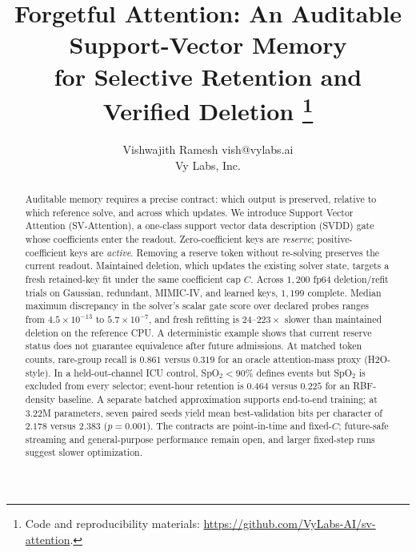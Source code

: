 \documentclass{article}
\title{Forgetful Attention: An Auditable Support-Vector Memory\\
for Selective Retention and Verified Deletion%
\thanks{Code and reproducibility materials:
\url{https://github.com/VyLabs-AI/sv-attention}.}}
\author{\name Vishwajith Ramesh \email vish@vylabs.ai \\
        \addr Vy Labs, Inc.}
\theoremstyle{definition}
\begin{document}
\maketitle

\begin{abstract}
Auditable memory requires a precise contract: which output is preserved,
relative to which reference solve, and across which updates. We introduce
Support Vector Attention (SV-Attention), a one-class support vector data
description (SVDD) gate whose coefficients enter the readout. Zero-coefficient
keys are \emph{reserve}; positive-coefficient keys are \emph{active}. Removing a
reserve token without re-solving preserves the current readout. Maintained
deletion, which updates the existing solver state, targets a fresh retained-key
fit under the same coefficient cap \(C\). Across \(1{,}200\) fp64
deletion/refit trials on Gaussian, redundant, MIMIC-IV, and learned keys,
\(1{,}199\) complete. Median maximum discrepancy in the solver's scalar gate
score over declared probes ranges from \(4.5\times10^{-13}\) to
\(5.7\times10^{-7}\), and fresh
refitting is \(24\)--\(223\times\) slower than maintained deletion on the
reference CPU. A deterministic example shows that current reserve status does
not guarantee equivalence after future admissions. At matched token counts,
rare-group recall is \(0.861\) versus \(0.319\) for an oracle attention-mass
proxy (H2O-style). In a held-out-channel ICU control, SpO\(_2<90\%\) defines
events but SpO\(_2\) is excluded from every selector; event-hour retention is
\(0.464\) versus \(0.225\) for an RBF-density baseline. A separate batched
approximation supports end-to-end training; at \(3.22\)M parameters, seven
paired seeds yield mean best-validation bits per character of \(2.178\) versus
\(2.383\) (\(p=0.001\)). The contracts are point-in-time and fixed-\(C\);
future-safe streaming and general-purpose performance remain open, and larger
fixed-step runs suggest slower optimization.
\end{abstract}






\appendix

\end{document}

